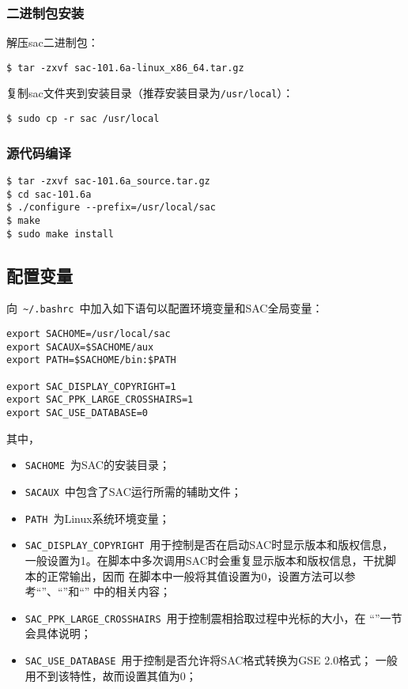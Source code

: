 \subsubsection*{二进制包安装}
解压sac二进制包：
\begin{lstlisting}[style=Shell]
$ tar -zxvf sac-101.6a-linux_x86_64.tar.gz
\end{lstlisting}

复制sac文件夹到安装目录（推荐安装目录为\lstinline{/usr/local}）：
\begin{lstlisting}[style=Shell]
$ sudo cp -r sac /usr/local
\end{lstlisting}

\subsubsection*{源代码编译}
\begin{lstlisting}[style=Shell]
$ tar -zxvf sac-101.6a_source.tar.gz
$ cd sac-101.6a
$ ./configure --prefix=/usr/local/sac
$ make
$ sudo make install
\end{lstlisting}

\subsection*{配置变量}
向~\lstinline{~/.bashrc}~中加入如下语句以配置环境变量和SAC全局变量：
\begin{lstlisting}[style=Bash]
export SACHOME=/usr/local/sac
export SACAUX=$SACHOME/aux
export PATH=$SACHOME/bin:$PATH

export SAC_DISPLAY_COPYRIGHT=1
export SAC_PPK_LARGE_CROSSHAIRS=1
export SAC_USE_DATABASE=0
\end{lstlisting}

其中，
\begin{itemize}
\item \lstinline{SACHOME}~为SAC的安装目录；
\item \lstinline{SACAUX}~中包含了SAC运行所需的辅助文件；
\item \lstinline{PATH}~为Linux系统环境变量；
\item \lstinline{SAC_DISPLAY_COPYRIGHT}~用于控制是否在启动SAC时显示版本和版权信息，
    一般设置为1。在脚本中多次调用SAC时会重复显示版本和版权信息，干扰脚本的正常输出，因而
    在脚本中一般将其值设置为0，设置方法可以参考``''、``''和``''
    中的相关内容；
\item \lstinline{SAC_PPK_LARGE_CROSSHAIRS}~用于控制震相拾取过程中光标的大小，在
    ``''一节会具体说明；
\item \lstinline{SAC_USE_DATABASE}~用于控制是否允许将SAC格式转换为GSE 2.0格式；
    一般用不到该特性，故而设置其值为0；
\end{itemize}

